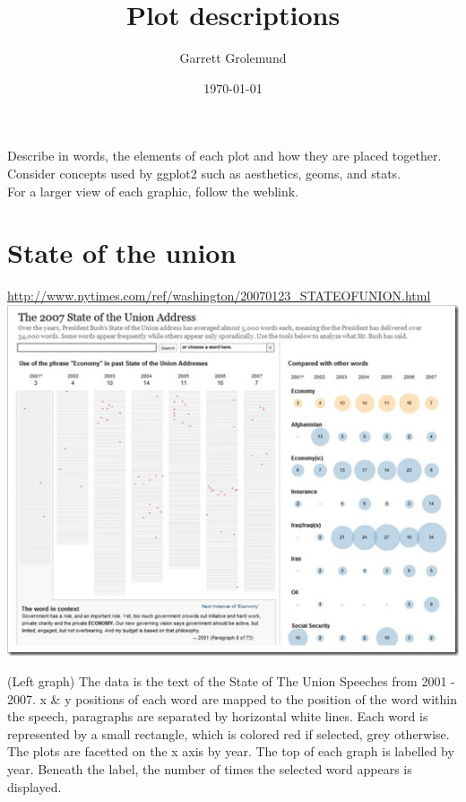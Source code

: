 \documentclass{article}
\begin{document}
\title{Plot descriptions}
\author{Garrett Grolemund}
\date{\today}
\maketitle


\noindent Describe in words, the elements of each plot and how they are placed together. Consider concepts used by ggplot2 such as aesthetics, geoms, and stats.\\

\noindent For a larger view of each graphic, follow the weblink.


\section{State of the union}
\href{http://www.nytimes.com/ref/washington/20070123\_STATEOFUNION.html}{http://www.nytimes.com/ref/washington/20070123\_STATEOFUNION.html}\\

  \includegraphics[width=1.0\textwidth]{plots/nytimesUnion.jpg} %

(Left graph) The data is the text of the State of The Union Speeches from 2001 - 2007. x \& y positions of each word are mapped to the position of the word within the speech, paragraphs are separated by horizontal white lines.
Each word is represented by a small rectangle, which is colored red if selected, grey otherwise.  The plots are facetted on the x axis by year. The top of each graph is labelled by year. Beneath the label, the number of times the selected word appears is displayed.
\end{document}
